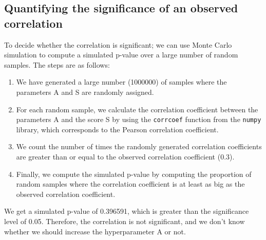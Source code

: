 \subsection{Quantifying the significance of an observed correlation}
  To decide whether the correlation is significant; we can use Monte Carlo simulation to compute a simulated p-value
over a large number of random samples.
The steps are as follows:

\begin{enumerate}
    \item We have generated a large number (1000000) of samples where the parameters A and S are randomly assigned.
    \item For each random sample, we calculate the correlation coefficient between the parameters A and the score S
    by using the \texttt{corrcoef} function from the \texttt{numpy} library, which corresponds to the Pearson
    correlation coefficient.
    \item We count the number of times the randomly generated correlation coefficients are greater than or equal to the
    observed correlation coefficient (0.3).
    \item Finally, we compute the simulated p-value by computing the proportion of random samples where the correlation
    coefficient is at least as big as the observed correlation coefficient.
\end{enumerate}

We get a simulated p-value of 0.396591, which is greater than the significance level of 0.05.
Therefore, the correlation is not significant, and we don't know whether we should increase the hyperparameter A or not.